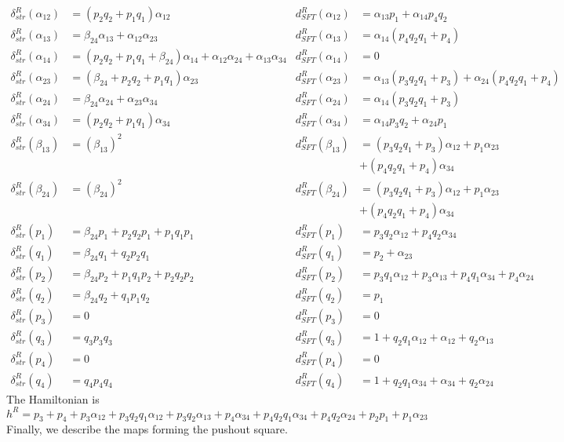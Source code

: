 \documentclass[a4paper,final, reqno]{amsart}
\theoremstyle{plain}
\theoremstyle{definition}
\begin{document}
		\begin{align*}
			\delta_{str}^R(\alpha_{12}) &= (p_2q_2+p_1q_1)\alpha_{12} & d_{SFT}^R(\alpha_{12}) &= \alpha_{13}p_1 + \alpha_{14}p_4q_2 \\
			\delta_{str}^R(\alpha_{13}) &= \beta_{24}\alpha_{13} + \alpha_{12}\alpha_{23} & d_{SFT}^R(\alpha_{13}) &= \alpha_{14}(p_4q_2q_1 + p_4) \\
			\delta_{str}^R(\alpha_{14}) &= (p_2q_2+p_1q_1+\beta_{24})\alpha_{14} + \alpha_{12}\alpha_{24} + \alpha_{13}\alpha_{34} & d_{SFT}^R(\alpha_{14}) &= 0 \\
			\delta_{str}^R(\alpha_{23}) &= (\beta_{24} + p_2q_2+p_1q_1)\alpha_{23} & d_{SFT}^R(\alpha_{23}) &= \alpha_{13}(p_3q_2q_1+p_3) + \alpha_{24}(p_4q_2q_1+p_4) \\
			\delta_{str}^R(\alpha_{24}) &= \beta_{24}\alpha_{24} + \alpha_{23}\alpha_{34} & d_{SFT}^R(\alpha_{24}) &= \alpha_{14}(p_3q_2q_1+p_3) \\
			\delta_{str}^R(\alpha_{34}) &= (p_2q_2+p_1q_1)\alpha_{34} & d_{SFT}^R(\alpha_{34}) &= \alpha_{14}p_3q_2+\alpha_{24}p_1 \\
			\delta_{str}^R(\beta_{13}) &= \left(\beta_{13}\right)^2 & d_{SFT}^R(\beta_{13}) &= (p_3q_2q_1+p_3)\alpha_{12} + p_1\alpha_{23} \\
			& & &+ (p_4q_2q_1+p_4)\alpha_{34} \\
			\delta_{str}^R(\beta_{24}) &= \left(\beta_{24}\right)^2 & d_{SFT}^R(\beta_{24}) &= (p_3q_2q_1+p_3)\alpha_{12} + p_1\alpha_{23} \\
			& & &+ (p_4q_2q_1+p_4)\alpha_{34} \\
			\delta_{str}^R(p_1) &= \beta_{24}p_1+p_2q_2p_1+p_1q_1p_1 & d_{SFT}^R(p_1) &= p_3q_2\alpha_{12}+p_4q_2\alpha_{34} \\
			\delta_{str}^R(q_1) &= \beta_{24}q_1+q_2p_2q_1 & d_{SFT}^R(q_1) &= p_2+\alpha_{23} \\
			\delta_{str}^R(p_2) &= \beta_{24}p_2+p_1q_1p_2+p_2q_2p_2 & d_{SFT}^R(p_2) &= p_3q_1\alpha_{12}+p_3\alpha_{13}+p_4q_1\alpha_{34}+p_4\alpha_{24} \\
			\delta_{str}^R(q_2) &= \beta_{24}q_2+q_1p_1q_2 & d_{SFT}^R(q_2) &= p_1 \\
			\delta_{str}^R(p_3) &= 0 & d_{SFT}^R(p_3) &= 0 \\
			\delta_{str}^R(q_3) &= q_3p_3q_3 & d_{SFT}^R(q_3) &= 1+q_2q_1\alpha_{12}+\alpha_{12}+q_2\alpha_{13} \\
			\delta_{str}^R(p_4) &= 0 & d_{SFT}^R(p_4) &= 0 \\
			\delta_{str}^R(q_4) &= q_4p_4q_4 & d_{SFT}^R(q_4) &= 1+q_2q_1\alpha_{34}+\alpha_{34}+q_2\alpha_{24}
		\end{align*}
		The Hamiltonian is 
		\[ h^R = p_3+p_4+p_3\alpha_{12}+p_3q_2q_1\alpha_{12}+p_3q_2\alpha_{13}+p_4\alpha_{34}+p_4q_2q_1\alpha_{34}+p_4q_2\alpha_{24}+p_2p_1+p_1\alpha_{23}\]
		Finally, we describe the maps forming the pushout square.
		
\end{document}
